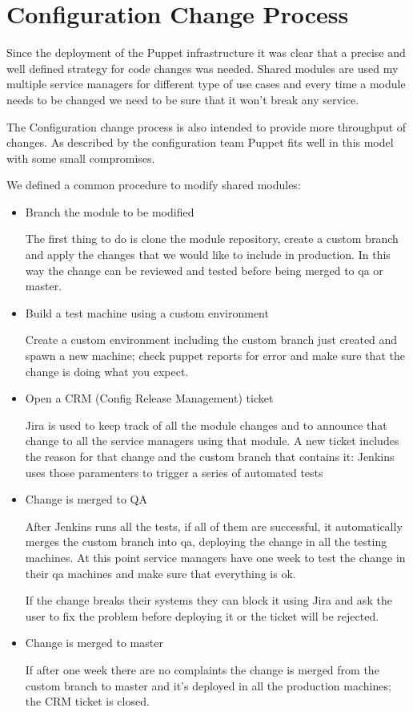 \section{Configuration Change Process}

Since the deployment of the Puppet infrastructure it was clear that
a precise and well defined strategy for code changes was needed. Shared
modules are used my multiple service managers for different type of use
cases and every time a module needs to be changed we need to be sure that
it won't break any service.

The Configuration change process is also intended to provide more throughput of
changes. As described by the configuration team \cite{benAgile} Puppet fits
well in this model with some small compromises.

We defined a common procedure to modify shared modules:

\begin{itemize}

\item Branch the module to be modified

The first thing to do is clone the module repository, create a custom
branch and apply the changes that we would like to include in production.
In this way the change can be reviewed and tested before being merged to
qa or master.

\item Build a test machine using a custom environment

Create a custom environment including the custom branch just created and spawn
a new machine; check puppet reports for error and make sure that the change is
doing what you expect.

\item Open a CRM (Config Release Management) ticket

Jira is used to keep track of all the module changes and to announce that
change to all the service managers using that module. A new ticket includes the
reason for that change and the custom branch that contains it: Jenkins uses
those paramenters to trigger a series of automated tests

\item Change is merged to QA

After Jenkins runs all the tests, if all of them are successful, it
automatically merges the custom branch into qa, deploying the change in all the
testing machines. At this point service managers have one week to test the
change in their qa machines and make sure that everything is ok.

If the change breaks their systems they can block it using Jira and ask the
user to fix the problem before deploying it or the ticket will be rejected.

\item Change is merged to master

If after one week there are no complaints the change is merged from the custom
branch to master and it's deployed in all the production machines; the CRM
ticket is closed.

\end{itemize}

